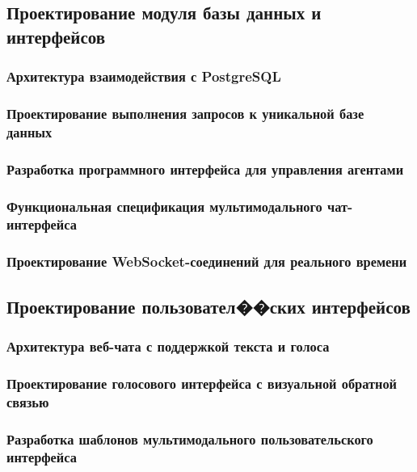 \documentclass{syksu-coursework}
\begin{document}
\subsection{Проектирование модуля базы данных и интерфейсов}

\subsubsection{Архитектура взаимодействия с PostgreSQL}

\subsubsection{Проектирование выполнения запросов к уникальной базе данных}

\subsubsection{Разработка программного интерфейса для управления агентами}

\subsubsection{Функциональная спецификация мультимодального чат-интерфейса}

\subsubsection{Проектирование WebSocket-соединений для реального времени}

\subsection{Проектирование пользовател��ских интерфейсов}

\subsubsection{Архитектура веб-чата с поддержкой текста и голоса}

\subsubsection{Проектирование голосового интерфейса с визуальной обратной связью}

\subsubsection{Разработка шаблонов мультимодального пользовательского интерфейса}
\end{document}
